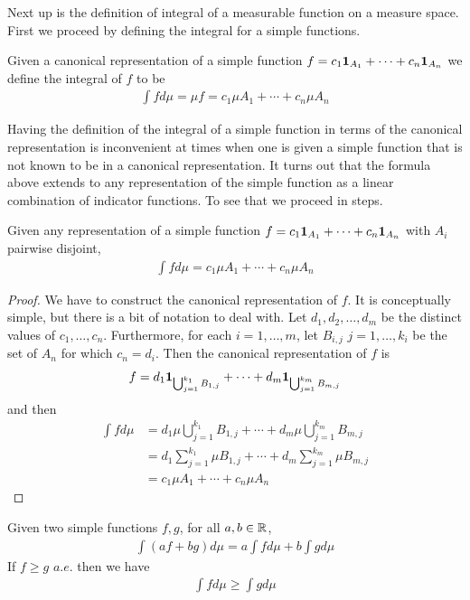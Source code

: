 Next up is the definition of integral of a measurable function on a
measure space.  First we proceed by defining the integral for a simple functions.
\begin{defn}
Given a canonical representation of a simple function $f =
c_1 \textbf{1}_{A_1} + \cdots + c_n \textbf{1}_{A_n}$ we
define the integral of $f$ to be
\begin{align*}
\int f d\mu = \mu f = c_1 \mu A_1 + \cdots + c_n \mu A_n
\end{align*}
\end{defn}
Having the definition of the integral of a simple function in terms of
the canonical representation is inconvenient at times when one is
given a simple function that is not known to be in a canonical
representation.  It turns out that the formula above extends to any
representation of the simple function as a linear combination of
indicator functions.  To see that we proceed in steps.
\begin{lem}Given any representation of a simple function $f =
c_1 \textbf{1}_{A_1} + \cdots + c_n \textbf{1}_{A_n}$ with
$A_i$ pairwise disjoint,
\begin{align*}
\int f d\mu = c_1 \mu A_1 + \cdots + c_n \mu A_n
\end{align*}
\end{lem}
\begin{proof}We have to construct the canonical representation of
  $f$.  It is conceptually simple, but there is a bit of notation to
  deal with.
  Let $d_1, d_2, \dots, d_m$ be the distinct values of $c_1, \dots,
  c_n$.  Furthermore, for each $i=1,\dots,m$, let $B_{i,j}$ 
  $j=1,\dots,k_i$ be the set of $A_n$ for which $c_n = d_i$.  Then the
  canonical representation of $f$ is 
\begin{align*}
f = d_1 \textbf{1}_{\bigcup_{j=1}^{k_1} B_{1,j}} + \cdots + d_m \textbf{1}_{\bigcup_{j=1}^{k_m} B_{m,j}}
\end{align*}
and then 
\begin{align*}
\int f d \mu &= d_1 \mu \bigcup_{j=1}^{k_1} B_{1,j} + \cdots + d_m \mu
\bigcup_{j=1}^{k_m} B_{m,j} \\
&= d_1 \sum_{j=1}^{k_1} \mu B_{1,j} + \cdots + d_m 
\sum_{j=1}^{k_m} \mu B_{m,j} \\
&= c_1 \mu A_1 + \cdots + c_n \mu A_n
\end{align*}
\end{proof}
\begin{lem}\label{LinearityIntegralSimpleFunctions}Given two simple functions $f,g$, for all $a,b \in \mathbb{R}$,
 \begin{align*}
\int \left (af + bg \right ) d \mu = a \int f d \mu + b \int g d \mu
\end{align*}
If $f \geq g$ $a.e.$ then we have
 \begin{align*}
\int f d \mu \geq \int g d \mu
\end{align*}
\end{lem}

